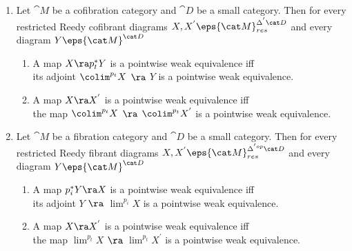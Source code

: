 \begin{prop}
\label{prop:restrictedproperty}
\mbox{}
\begin{enumerate}
\item
Let ${\cat M}$ be a cofibration category and ${\cat D}$ be a small category. Then for every restricted Reedy cofibrant diagrams $X, X^{'} \eps {\cat M}^{\Delta^{'}{\cat D}}_{res}$ and every diagram $Y \eps {\cat M}^{{\cat D}}$
\begin{enumerate}
\item
A map $X \ra p_t^* Y$ is a pointwise weak equivalence iff \\ its adjoint $\colim^{p_t} X$ $\ra$ $Y$ is a pointwise weak equivalence.
\item
A map $X \ra X^{'}$ is a pointwise weak equivalence iff \\ the map $\colim^{p_t} X$ $\ra$ $\colim^{p_t}X^{'}$ is a pointwise weak equivalence.
\end{enumerate}
\item
Let ${\cat M}$ be a fibration category and ${\cat D}$ be a small category. Then for every restricted Reedy fibrant diagrams $X, X^{'} \eps {\cat M}^{\Delta^{'op}{\cat D}}_{res}$ and every diagram $Y \eps {\cat M}^{{\cat D}}$
\begin{enumerate}
\item
A map $p_i^* Y \ra X$ is a pointwise weak equivalence iff \\ its adjoint $Y$ $\ra$ $\lim^{p_i} X$ is a pointwise weak equivalence.
\item
A map $X \ra X^{'}$ is a pointwise weak equivalence iff \\ the map $\lim^{p_t} X$ $\ra$ $\lim^{p_t}X^{'}$ is a pointwise weak equivalence.
\end{enumerate}
\end{enumerate}
\end{prop}

